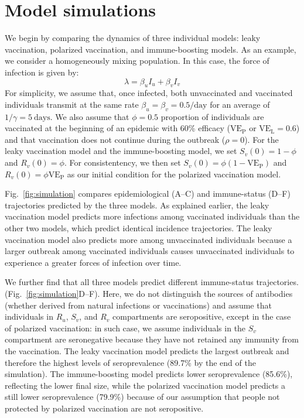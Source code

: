 \documentclass[12pt]{article}
\newcommand{\fref}[1]{Fig.~\ref{fig:#1}}
\newcommand{\VE}{\ensuremath{\mathrm{VE}}}
\newcommand{\VEP}{\ensuremath{\VE_{\mathrm{P}}}}
\newcommand{\VEL}{\ensuremath{\VE_{\mathrm{L}}}}
\begin{document}
\section*{Model simulations}

We begin by comparing the dynamics of three individual models: leaky vaccination, polarized vaccination, and immune-boosting models.
As an example, we consider a homogeneously mixing population. In this case, the force of infection is given by:
\begin{equation}
\lambda = \beta_u I_u + \beta_v I_v
\end{equation}
For simplicity, we assume that, once infected, both unvaccinated and vaccinated individuals transmit at the same rate $\beta_u = \beta_v =0.5/\mathrm{day}$ for an average of $1/\gamma=5~\mathrm{days}$.
We also assume that $\phi = 0.5$ proportion of individuals are vaccinated at the beginning of an epidemic with 60\% efficacy ($\VEP$ or $\VEL=0.6$) and that vaccination does not continue during the outbreak ($\rho = 0$).
For the leaky vaccination model and the immune-boosting model, we set $S_v(0) = 1-\phi$ and $R_v(0) = \phi$.
For consistentency, we then set $S_v(0) = \phi (1-\VEP)$ and $R_v(0) = \phi \VEP$ as our initial condition for the polarized vaccination model.

\fref{simulation} compares epidemiological (A--C) and immune-status (D--F) trajectories predicted by the three models.
As explained earlier, the leaky vaccination model predicts more infections among vaccinated individuals than the other two models, which predict identical incidence trajectories.
The leaky vaccination model also predicts more among unvaccinated individuals because a larger outbreak among vaccinated individuals causes unvaccinated individuals to experience a greater forces of infection over time.

We further find that all three models predict different immune-status trajectories. (\fref{simulation}D--F). 
Here, we do not distinguish the sources of antibodies (whether derived from natural infections or vaccinations) and assume that individuals in $R_u$, $S_v$, and $R_v$ compartments are seropositive, except in the case of polarized vaccination:
in such case, we assume individuals in the $S_v$ compartment are seronegative because they have not retained any immunity from the vaccination.
The leaky vaccination model predicts the largest outbreak and therefore the highest levels of seroprevalence (89.7\% by the end of the simulation).
The immune-boosting model predicts lower seroprevalence (85.6\%), reflecting the lower final size, while 
the polarized vaccination model predicts a still lower seroprevalence (79.9\%) because of our assumption that people not protected by polarized vaccination are not seropositive.
\end{document}
